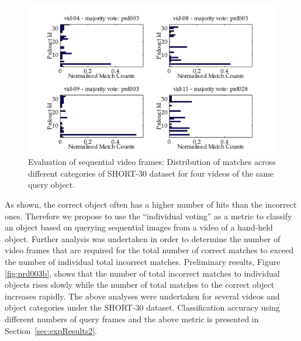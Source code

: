 \begin{figure}[t]
\centering
\includegraphics[width=\linewidth]{./gfx/Chapter02/prd003_distribution_bar-latex.pdf}
\caption{Evaluation of sequential video frames: Distribution of matches across different categories of SHORT-30 dataset for four videos of the same query object.}
\label{fig:prd003a}
\end{figure}


As shown, the correct object often has a higher number of hits than the incorrect ones. Therefore we propose to use the ``individual voting'' as a metric to classify an object based on querying sequential images from a video of a hand-held object. Further analysis was undertaken in order to determine the number of video frames that are required for the total number of correct matches to exceed the number of individual total incorrect matches. Preliminary results, Figure \ref{fig:prd003b}, shows that the number of total incorrect matches to individual objects rises slowly while the number of total matches to the correct object increases rapidly. The above analyses were undertaken for several videos and object categories under the SHORT-30 dataset. Classification accuracy using different numbers of query frames and the above metric is presented in Section~\ref{sec:expResults2}.


